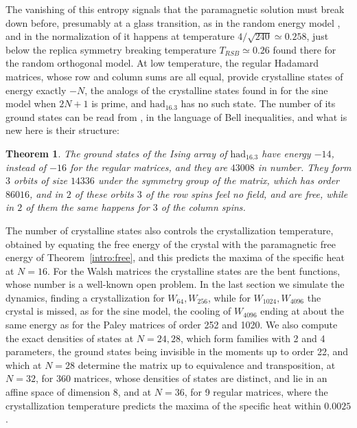 \documentclass[11pt,a4paper]{article}
\newtheorem{introthm}{Theorem}
\theoremstyle{remark}
\begin{document}
The vanishing of this entropy signals that the paramagnetic solution must break down before, presumably at a glass transition, as in the random energy model \cite{der}, and in the normalization of \cite{mp2} it happens at temperature $4/\sqrt{240}\simeq0.258$, just below the replica symmetry breaking temperature $T_{RSB}\simeq0.26$ found there for the random orthogonal model. At low temperature, the regular Hadamard matrices, whose row and column sums are all equal, provide crystalline states of energy exactly $-N$, the analogs of the crystalline states found in \cite{mp2} for the sine model when $2N+1$ is prime, and $\mathrm{had}_{16.3}$ has no such state. The number of its ground states can be read from \cite{gbt}, in the language of Bell inequalities, and what is new here is their structure:

\begin{samepage}
\begin{introthm}\label{intro:ground}
The ground states of the Ising array of $\mathrm{had}_{16.3}$ have energy $-14$, instead of $-16$ for the regular matrices, and they are $43008$ in number. They form $3$ orbits of size $14336$ under the symmetry group of the matrix, which has order $86016$, and in $2$ of these orbits $3$ of the row spins feel no field, and are free, while in $2$ of them the same happens for $3$ of the column spins.
\end{introthm}
\end{samepage}

The number of crystalline states also controls the crystallization temperature, obtained by equating the free energy of the crystal with the paramagnetic free energy of Theorem~\ref{intro:free}, and this predicts the maxima of the specific heat at $N=16$. For the Walsh matrices the crystalline states are the bent functions, whose number is a well-known open problem. In the last section we simulate the dynamics, finding a crystallization for $W_{64},W_{256}$, while for $W_{1024},W_{4096}$ the crystal is missed, as for the sine model, the cooling of $W_{4096}$ ending at about the same energy as for the Paley matrices of order 252 and 1020. We also compute the exact densities of states at $N=24,28$, which form families with 2 and 4 parameters, the ground states being invisible in the moments up to order 22, and which at $N=28$ determine the matrix up to equivalence and transposition, at $N=32$, for 360 matrices, whose densities of states are distinct, and lie in an affine space of dimension 8, and at $N=36$, for 9 regular matrices, where the crystallization temperature predicts the maxima of the specific heat within $0.0025$.
\end{document}
